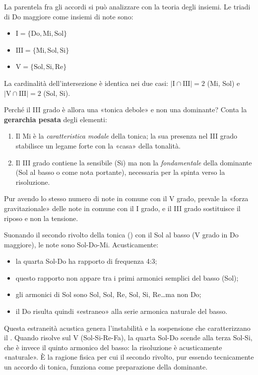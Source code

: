 \begin{matematica}
	\label{math:identita_iii}
	La parentela fra gli accordi si può analizzare con la teoria degli insiemi. Le triadi di Do maggiore come insiemi di note sono:
	\begin{itemize}
		\item $\text{I} = \{\text{Do}, \text{Mi}, \text{Sol}\}$
		\item $\text{III} = \{\text{Mi}, \text{Sol}, \text{Si}\}$
		\item $\text{V} = \{\text{Sol}, \text{Si}, \text{Re}\}$
	\end{itemize}
	La cardinalità dell'intersezione è identica nei due casi: $|\text{I} \cap \text{III}| = 2$ (Mi, Sol) e $|\text{V} \cap \text{III}| = 2$ (Sol, Si).

	Perché il III grado è allora una «tonica debole» e non una dominante? Conta la \textbf{gerarchia pesata} degli elementi:
	\begin{enumerate}
		\item Il Mi è la \textit{caratteristica modale} della tonica; la sua presenza nel III grado stabilisce un legame forte con la «casa» della tonalità.
		\item Il III grado contiene la sensibile (Si) ma non la \textit{fondamentale} della dominante (Sol al basso o come nota portante), necessaria per la spinta verso la risoluzione.
	\end{enumerate}
	Pur avendo lo stesso numero di note in comune con il V grado, prevale la «forza gravitazionale» delle note in comune con il I grado, e il III grado sostituisce il riposo e non la tensione.
\end{matematica}

\begin{fisica}
	\label{phys:i64_sospeso}
	Suonando il secondo rivolto della tonica () con il Sol al basso (V grado in Do maggiore), le note sono Sol-Do-Mi. Acusticamente:

	\begin{itemize}
		\item la quarta Sol-Do ha rapporto di frequenza 4:3;
		\item questo rapporto non appare tra i primi armonici semplici del basso (Sol);
		\item gli armonici di Sol sono Sol, Sol, Re, Sol, Si, Re\ldots ma non Do;
		\item il Do risulta quindi «estraneo» alla serie armonica naturale del basso.
	\end{itemize}

	Questa estraneità acustica genera l'instabilità e la sospensione che caratterizzano il . Quando risolve sul V (Sol-Si-Re-Fa), la quarta Sol-Do scende alla terza Sol-Si, che è invece il quinto armonico del basso: la risoluzione è acusticamente «naturale». È la ragione fisica per cui il secondo rivolto, pur essendo tecnicamente un accordo di tonica, funziona come preparazione della dominante.
\end{fisica}

